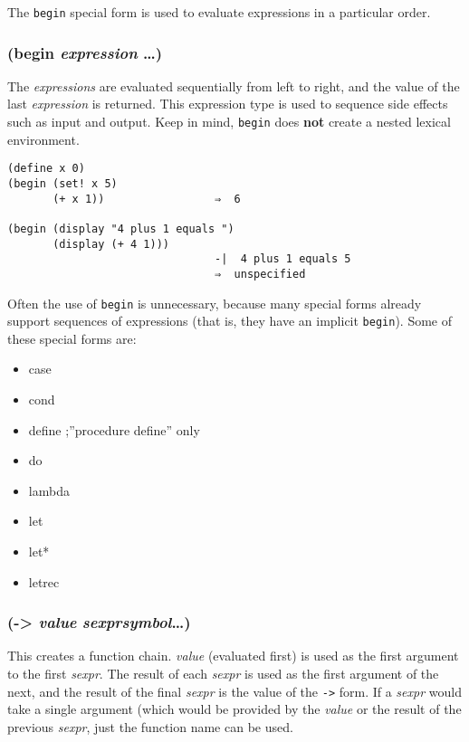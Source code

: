 \documentclass{article}
\begin{document}
The \verb|begin| special form is used to evaluate expressions in a particular order.

\subsubsection{(begin \emph{expression} \ldots{})}

The \emph{expressions} are evaluated sequentially from left to right, and the value of the
last \emph{expression} is returned. This expression type is used to sequence side effects such
as input and output. Keep in mind, \verb|begin| does \textbf{not} create a nested lexical
environment.

\begin{verbatim}
(define x 0)
(begin (set! x 5)
       (+ x 1))                 ⇒  6

(begin (display "4 plus 1 equals ")
       (display (+ 4 1)))
                                -|  4 plus 1 equals 5
                                ⇒  unspecified
\end{verbatim}

Often the use of \verb|begin| is unnecessary, because many special forms already support
sequences of expressions (that is, they have an implicit \verb|begin|). Some of these
special forms are:

\begin{itemize}
\item case
\item cond
\item define          ;''procedure define'' only
\item do
\item lambda
\item let
\item let*
\item letrec
\end{itemize}

\subsubsection{(-\textgreater{} \emph{value} \emph{sexpr}\textbar{}\emph{symbol}\ldots{})}

This creates a function chain. \emph{value} (evaluated first) is used as the first argument to
the first \emph{sexpr}. The result of each \emph{sexpr} is used as the first argument of the
next, and the result of the final \emph{sexpr} is the value of the \verb|->|
form. If a \emph{sexpr} would take a single argument (which would be provided by the
\emph{value} or the result of the previous \emph{sexpr}, just the function name can be used.
\end{document}
